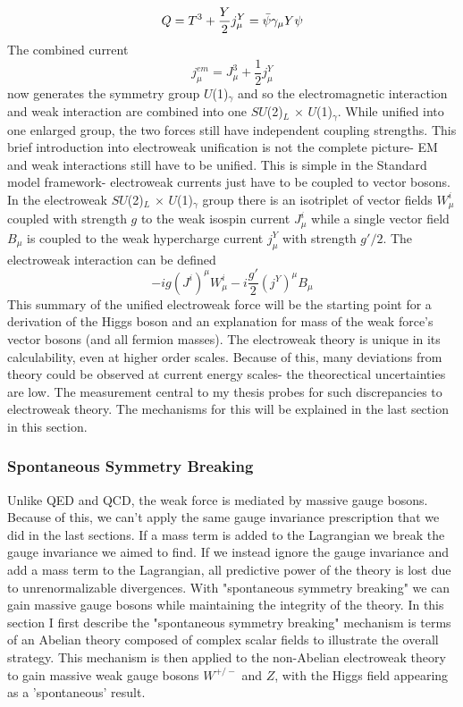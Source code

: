 \begin{equation}
Q=T^3+\frac{Y}{2} \\
j_\mu^Y =\bar{\psi}\gamma_\mu Y \psi
\end{equation}
The combined current 
\begin{equation}
j_\mu^{em} = J_\mu^3+\frac{1}{2}j_\mu^Y
\end{equation}
now generates the symmetry group $U$(1)$_\gamma$ and so the electromagnetic interaction and weak interaction are combined into one $SU$(2)$_L$ $\times$ $U$(1)$_\gamma$. While unified into one enlarged group, the two forces still have independent coupling strengths. This brief introduction into electroweak unification is not the complete picture- EM and weak interactions still have to be unified. This is simple in the Standard model framework- electroweak currents just have to be coupled to vector bosons. In the electroweak $SU$(2)$_L$ $\times$ $U$(1)$_\gamma$ group there is an isotriplet of vector fields $W_\mu^i$ coupled with strength $g$ to the weak isospin current $J_\mu^i$ while a single vector field $B_\mu$ is coupled to the weak hypercharge current $j_\mu^Y$ with strength $g'/2$. The electroweak interaction can be defined
\begin{equation}
-i g (J^i)^\mu W_\mu^i-i\frac{g'}{2}(j^Y)^\mu B_\mu
\end{equation}
This summary of the unified electroweak force will be the starting point for a derivation of the Higgs boson and an explanation for mass of the weak force's vector bosons (and all fermion masses). The electroweak theory is unique in its calculability, even at higher order scales. Because of this, many deviations from theory could be observed at current energy scales- the theorectical uncertainties are low. The measurement central to my thesis probes for such discrepancies to electroweak theory. The mechanisms for this will be explained in the last section in this section. 

\subsubsection{Spontaneous Symmetry Breaking}
Unlike QED and QCD, the weak force is mediated by massive gauge bosons. Because of this, we can't apply the same gauge invariance prescription that we did in the last sections. If a mass term is added to the Lagrangian we break the gauge invariance we aimed to find. If we instead ignore the gauge invariance and add a mass term to the Lagrangian, all predictive power of the theory is lost due to unrenormalizable divergences. With "spontaneous symmetry breaking" we can gain massive gauge bosons while maintaining the integrity of the theory. In this section I first describe the "spontaneous symmetry breaking" mechanism is terms of an Abelian theory composed of complex scalar fields to illustrate the overall strategy. This mechanism is then applied to the non-Abelian electroweak theory to gain massive weak gauge bosons $W^{+/-}$ and $Z$, with the Higgs field appearing as a 'spontaneous' result.

